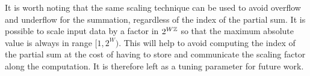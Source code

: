     It is worth noting that the same scaling technique can be used to avoid
    overflow and underflow for the summation, regardless of the index of the partial sum.
    It is possible to scale input data by a factor in $2^{W\mathbb{Z}}$ so that the maximum
    absolute value is always in range $[1,2^W)$.
    This will help to avoid computing the index of the partial sum
    at the cost of having to store and communicate the scaling factor along the computation.
    It is therefore left as a tuning parameter for future work.

